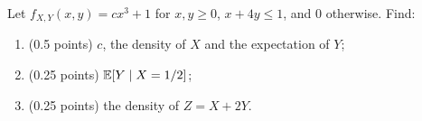 \documentclass[a4paper]{report}
\begin{document}
\begin{problem}
Let $f_{X,Y}(x,y)=cx^3+1$ for $x,y\geq0$, $x+4y\leq1$, and 0 otherwise. Find:
\begin{enumerate}
\item (0.5 points) $c$, the density of $X$ and the expectation of $Y$;
\item (0.25 points) $\mathbb {E}[Y\mid X=1/2]$;
\item (0.25 points) the density of $Z=X+2Y$.
\end{enumerate}
\end{problem}
\end{document}
